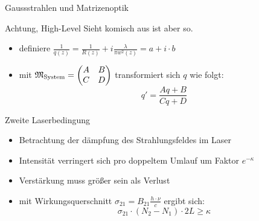 \documentclass[10pt, aspectratio=169]{beamer}
\begin{document}
\begin{frame}{Gaussstrahlen und Matrizenoptik}
  \begin{alertblock}{Achtung, High-Level}
    Sieht komisch aus ist aber so.
  \end{alertblock}

  \begin{itemize}
  \item<2-> definiere
    \(\frac{1}{q(z)}=\frac{1}{R(z)}+i\frac{\lambda}{\pi
      w^2(z)}=a+i\cdot b\) 
  \item<3-> mit
    \(\mathfrak{M}_{\text{System}} = \mqty(A & B \\ C & D)\)
    transformiert sich \(q\) wie folgt:
    \begin{equation}
      \label{eq:qtrans}
      q'=\frac{Aq + B}{Cq+D}
    \end{equation}
     
  \end{itemize}
\end{frame}

\begin{frame}{Zweite Laserbedingung}
  \begin{itemize}
  \item<1-> Betrachtung der d\"ampfung des Strahlungsfeldes im Laser
  \item<2-> Intensität verringert sich pro doppeltem Umlauf um Faktor
    \(e^{-\kappa}\) 
  \item<3-> Verst\"arkung muss gr\"o\ss{}er sein als Verlust
  \item<4-> mit Wirkungsquerschnitt   \(\sigma_{21}=B_{21}\frac{h\cdot\nu}{c}\) ergibt
    sich:
    \begin{equation}
      \label{eq:zwlabe}
      \tag{zweite Laserbedingung}
      \sigma_{21}\cdot (N_2-N_1)\cdot 2L \geq \kappa
    \end{equation}
  \end{itemize}
\end{frame}
\end{document}
